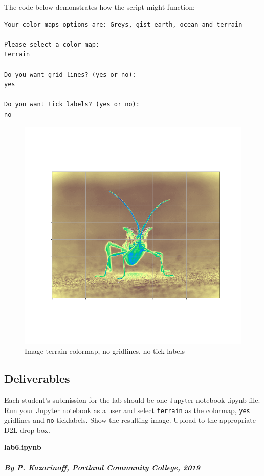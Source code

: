 \documentclass[11pt]{article}
\begin{document}
\newpage

The code below demonstrates how the script might function:

\begin{verbatim}
Your color maps options are: Greys, gist_earth, ocean and terrain

Please select a color map:
terrain

Do you want grid lines? (yes or no):
yes

Do you want tick labels? (yes or no):
no
\end{verbatim}

\begin{figure}[!h]
\centering
\includegraphics[scale=0.4]{images/image1.png}
\caption{Image terrain colormap, no gridlines, no tick labels}
\end{figure}

\hypertarget{deliverables}{%
\subsection{Deliverables}\label{deliverables}}

Each student's submission for the lab should be one Jupyter notebook
.ipynb-file. Run your Jupyter notebook as a user and select
\texttt{terrain} as the colormap, \texttt{yes} gridlines and \texttt{no}
ticklabels. Show the resulting image. Upload to the appropriate D2L drop
box.

\textbf{lab6.ipynb}

\hypertarget{by-p.-kazarinoff-portland-community-college-2019}{%
\paragraph{\texorpdfstring{\emph{By P. Kazarinoff, Portland Community
College,
2019}}{By P. Kazarinoff, Portland Community College, 2019}}\label{by-p.-kazarinoff-portland-community-college-2019}}
\end{document}
